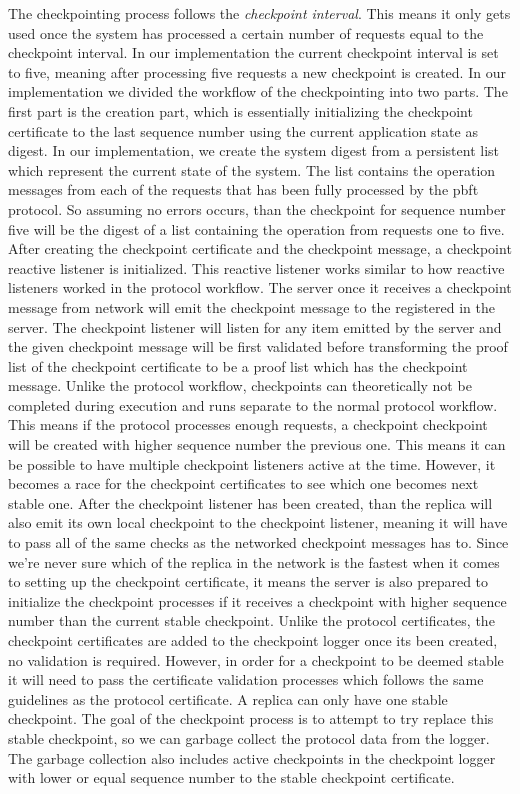\iffalse 
The checkpointing process follows the \emph{checkpoint interval}. This means it only gets used once the system has processed a certain number of requests equal to the checkpoint interval. In our implementation the current checkpoint interval is set to five, meaning after processing five requests a new checkpoint is created. In our implementation we divided the workflow of the checkpointing into two parts.
The first part is the creation part, which is essentially initializing the checkpoint certificate to the last sequence number using the current application state as digest. In our implementation, we create the system digest from a persistent list which represent the current state of the system. The list contains the operation messages from each of the requests that has been fully processed by the \ac{pbft} protocol. So assuming no errors occurs, than the checkpoint for sequence number five will be the digest of a list containing the operation from requests one to five. After creating the checkpoint certificate and the checkpoint message, a checkpoint reactive listener is initialized. This reactive listener works similar to how reactive listeners worked in the protocol workflow. The server once it receives a checkpoint message from network will emit the checkpoint message to the  registered in the server. The checkpoint listener will listen for any item emitted by the server and the given checkpoint message will be first validated before transforming the proof list of the checkpoint  certificate to be a proof list which has the checkpoint message. Unlike the protocol workflow, checkpoints can theoretically not be completed during execution and runs separate to the normal protocol workflow. This means if the protocol processes enough requests, a checkpoint checkpoint will be created with higher sequence number the previous one. This means it can be possible to have multiple checkpoint listeners active at the time. However, it becomes a race for the checkpoint certificates to see which one becomes next stable one. After the checkpoint listener has been created, than the replica will also emit its own local checkpoint to the checkpoint listener, meaning it will have to pass all of the same checks as the networked checkpoint messages has to. Since we're never sure which of the replica in the network is the fastest when it comes to setting up the checkpoint certificate, it means the server is also prepared to initialize the checkpoint processes if it receives a checkpoint with higher sequence number than the current stable checkpoint. Unlike the protocol certificates, the checkpoint certificates are added to the checkpoint logger once its been created, no validation is required. However, in order for a checkpoint to be deemed stable it will need to pass the certificate validation processes which follows the same guidelines as the protocol certificate. A replica can only have one stable checkpoint. The goal of the checkpoint process is to attempt to try replace this stable checkpoint, so we can garbage collect the protocol data from the logger. The garbage collection also includes active checkpoints in the checkpoint logger with lower or equal sequence number to the stable checkpoint certificate.
